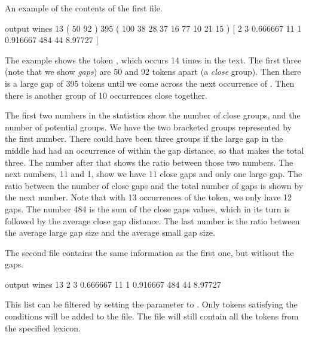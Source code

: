 \documentclass[a4paper,10pt,twoside]{report}
\begin{document}
An example of the contents of the first file.

\begin{wout}{ output}
wines 13 ( 50 92 ) 395 ( 100 38 28 37 16 77 10 21 15 )
                            [ 2 3 0.666667 11 1 0.916667 484 44 8.97727 ]
\end{wout}

The example shows the token , which occurs \num{14} times
in the text. The first three (note that we show \emph{gaps}) are
\num{50} and \num{92} tokens apart (a \emph{close} group). Then there
is a large gap of \num{395} tokens until we come across the next
occurrence of . Then there is another group of \num{10}
occurrences close together.

The first two numbers in the statistics show the number of close
groups, and the number of potential groups. We have the two bracketed
groups represented by the first number. There could have been three
groups if the large gap in the middle had had an occurrence of
 within the gap distance, so that makes the total
three. The number after that shows the ratio between those two
numbers. The next numbers, \num{11} and \num{1}, show we have \num{11}
close gaps and only one large gap. The ratio between the number of
close gaps and the total number of gaps is shown by the next
number. Note that with \num{13} occurrences of the token, we only have
\num{12} gaps. The number \num{484} is the sum of the close gaps
values, which in its turn is followed by the average close gap
distance. The last number is the ratio between the average large gap
size and the average small gap size.

The second file contains the same information as the first one, but
without the gaps.

\begin{wout}{ output}
wines 13 2 3 0.666667 11 1 0.916667 484 44 8.97727
\end{wout}

This list can be filtered by setting the  parameter to
. Only tokens satisfying the conditions will be added to the
 file. The  file will still contain all the tokens
from the specified lexicon.
\end{document}
